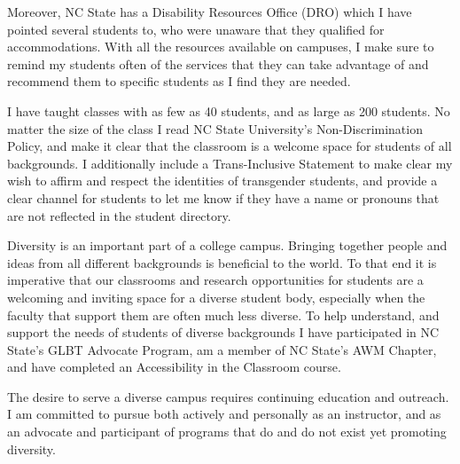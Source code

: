 \documentclass{article}[12pt]
\begin{document}
Moreover, NC State has a Disability Resources Office (DRO) which I have pointed several students to, who were unaware that they qualified for accommodations. With all the resources available on campuses, I make sure to remind my students often of the services that they can take advantage of and recommend them to specific students as I find they are needed.

I have taught classes with as few as 40 students, and as large as 200 students.
No matter the size of the class I read NC State University's Non-Discrimination Policy, and make it clear that the classroom is a welcome space for students of all backgrounds.  I additionally include a Trans-Inclusive Statement to make clear my wish to affirm and respect the identities of transgender students, and provide a clear channel for students to let me know if they have a name or pronouns that are not reflected in the student directory.

Diversity is an important part of a college campus.  Bringing together people and ideas from all different backgrounds is beneficial to the world.
To that end it is imperative that our classrooms and research opportunities for students are a welcoming and inviting space for a diverse student body, especially when the faculty that support them are often much less diverse.
To help understand, and support the needs of students of diverse backgrounds I have participated in NC State's GLBT Advocate Program, am a member of NC State's AWM Chapter, and have completed an Accessibility in the Classroom course. 

The desire to serve a diverse campus requires continuing education and outreach. I am committed to pursue both actively and personally as an instructor, and as an advocate and participant of programs that do and do not exist yet promoting diversity.
\end{document}
